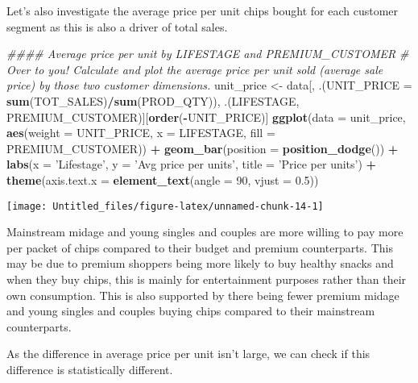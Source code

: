 \documentclass[]{article}
\newenvironment{Shaded}{\begin{snugshade}}{\end{snugshade}}
\newcommand{\CommentTok}[1]{\textcolor[rgb]{0.56,0.35,0.01}{\textit{#1}}}
\newcommand{\DataTypeTok}[1]{\textcolor[rgb]{0.13,0.29,0.53}{#1}}
\newcommand{\DecValTok}[1]{\textcolor[rgb]{0.00,0.00,0.81}{#1}}
\newcommand{\FloatTok}[1]{\textcolor[rgb]{0.00,0.00,0.81}{#1}}
\newcommand{\KeywordTok}[1]{\textcolor[rgb]{0.13,0.29,0.53}{\textbf{#1}}}
\newcommand{\NormalTok}[1]{#1}
\newcommand{\OperatorTok}[1]{\textcolor[rgb]{0.81,0.36,0.00}{\textbf{#1}}}
\newcommand{\StringTok}[1]{\textcolor[rgb]{0.31,0.60,0.02}{#1}}
\begin{document}
Let's also investigate the average price per unit chips bought for each
customer segment as this is also a driver of total sales.

\begin{Shaded}
\begin{Highlighting}[]
\CommentTok{#### Average price per unit by LIFESTAGE and PREMIUM_CUSTOMER}
\CommentTok{# Over to you! Calculate and plot the average price per unit sold (average sale price) by those two customer dimensions.}
\NormalTok{unit_price <-}\StringTok{ }\NormalTok{data[, .(}\DataTypeTok{UNIT_PRICE =} \KeywordTok{sum}\NormalTok{(TOT_SALES)}\OperatorTok{/}\KeywordTok{sum}\NormalTok{(PROD_QTY)),}
\NormalTok{                   .(LIFESTAGE, PREMIUM_CUSTOMER)][}\KeywordTok{order}\NormalTok{(}\OperatorTok{-}\NormalTok{UNIT_PRICE)]}
\KeywordTok{ggplot}\NormalTok{(}\DataTypeTok{data =}\NormalTok{ unit_price, }
       \KeywordTok{aes}\NormalTok{(}\DataTypeTok{weight =}\NormalTok{ UNIT_PRICE, }\DataTypeTok{x =}\NormalTok{ LIFESTAGE, }\DataTypeTok{fill =}\NormalTok{ PREMIUM_CUSTOMER)) }\OperatorTok{+}
\StringTok{  }\KeywordTok{geom_bar}\NormalTok{(}\DataTypeTok{position =} \KeywordTok{position_dodge}\NormalTok{()) }\OperatorTok{+}
\StringTok{  }\KeywordTok{labs}\NormalTok{(}\DataTypeTok{x =} \StringTok{'Lifestage'}\NormalTok{, }\DataTypeTok{y =} \StringTok{'Avg price per units'}\NormalTok{, }
       \DataTypeTok{title =} \StringTok{'Price per units'}\NormalTok{) }\OperatorTok{+}
\StringTok{  }\KeywordTok{theme}\NormalTok{(}\DataTypeTok{axis.text.x =} \KeywordTok{element_text}\NormalTok{(}\DataTypeTok{angle =} \DecValTok{90}\NormalTok{, }\DataTypeTok{vjust =} \FloatTok{0.5}\NormalTok{))}
\end{Highlighting}
\end{Shaded}

\begin{center}\texttt{[image: Untitled\_files/figure-latex/unnamed-chunk-14-1]} \end{center}

Mainstream midage and young singles and couples are more willing to pay
more per packet of chips compared to their budget and premium
counterparts. This may be due to premium shoppers being more likely to
buy healthy snacks and when they buy chips, this is mainly for
entertainment purposes rather than their own consumption. This is also
supported by there being fewer premium midage and young singles and
couples buying chips compared to their mainstream counterparts.

As the difference in average price per unit isn't large, we can check if
this difference is statistically different.
\end{document}
